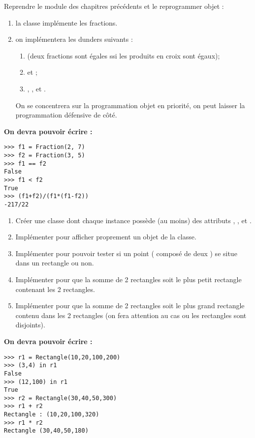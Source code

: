 \documentclass[a4paper,12pt,french]{book}
\begin{document}
\begin{exercice}[ : fractions]
	Reprendre le module  des chapitres précédents et le reprogrammer \og objet \fg{} :
	\begin{enumerate}[--]
		\item 	la classe  implémente les fractions.
		\item 	on implémentera les dunders suivants :
		\begin{enumerate}[--]
			\item 	{} (deux fractions sont égales ssi les produits en croix sont égaux);
			\item 	{} et ;
			\item 	{}, ,  et  .
		\end{enumerate}	
	On se concentrera sur la programmation objet en priorité, on peut laisser la programmation défensive de côté.
	\end{enumerate}
    \textbf{On devra pouvoir écrire :}
    \begin{verbatim}
>>> f1 = Fraction(2, 7)
>>> f2 = Fraction(3, 5)
>>> f1 == f2
False
>>> f1 < f2
True
>>> (f1+f2)/(f1*(f1-f2))
-217/22
\end{verbatim}
    
\end{exercice}

\begin{exercice}[]

\begin{enumerate}[\bfseries 1.]
	\item 	Créer une classe  dont chaque instance possède (au moins) des attributs , ,  et .
	\item	Implémenter  pour afficher \og proprement\fg{} un objet de la classe.
    \item   Implémenter  pour pouvoir tester si un point ( composé de deux ) se situe dans un rectangle ou non.
    \item 	Implémenter  pour que la somme de 2 rectangles soit le plus petit rectangle contenant les 2 rectangles.
    \item 	Implémenter  pour que la somme de 2 rectangles soit le plus grand rectangle contenu dans les 2 rectangles (on fera attention au cas ou les rectangles sont disjoints).   
\end{enumerate}
    \textbf{On devra pouvoir écrire :}
    \begin{verbatim}
>>> r1 = Rectangle(10,20,100,200)
>>> (3,4) in r1
False
>>> (12,100) in r1
True
>>> r2 = Rectangle(30,40,50,300)
>>> r1 + r2
Rectangle : (10,20,100,320)
>>> r1 * r2
Rectangle (30,40,50,180)
\end{verbatim}
\end{exercice}
\end{document}
